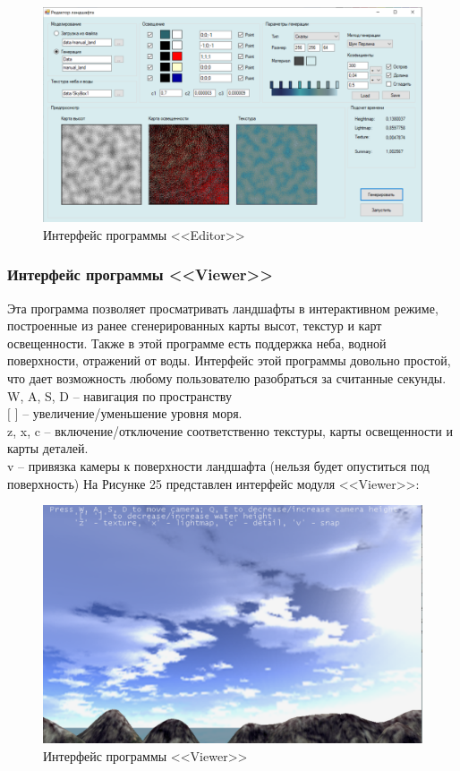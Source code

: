 \documentclass[a4paper, 10pt]{article}
\begin{document}
	 \begin{figure}[h!]
	 	\centering
	 	\includegraphics[scale=0.6]{editor2}
	 	\centering\caption{Интерфейс программы <<Editor>>}
	 \end{figure}
 	\subsubsection{Интерфейс программы <<Viewer>>}
 	\hspace*{5mm} Эта программа позволяет просматривать ландшафты в интерактивном режиме, построенные из ранее сгенерированных карты высот, текстур и карт освещенности. Также в этой программе есть поддержка неба, водной поверхности, отражений от воды. 
 	\clearpage
 	\newpage
 	\hspace*{5mm} Интерфейс этой программы довольно простой, что дает возможность любому пользователю разобраться за считанные секунды.
 	\\ W, A, S, D – навигация по пространству
 	\\ $[$ $]$ – увеличение/уменьшение уровня моря. 
 	\\ z, x, c – включение/отключение соответственно текстуры, карты освещенности и карты деталей.
 	\\ v – привязка камеры к поверхности ландшафта (нельзя будет опуститься под поверхность) 
 	На Рисунке 25 представлен интерфейс модуля <<Viewer>>: 
	\begin{figure}[h!]
		\centering
		\includegraphics[scale=0.6]{viewer1}
		\centering\caption{Интерфейс программы <<Viewer>>}
	\end{figure}
\end{document}
